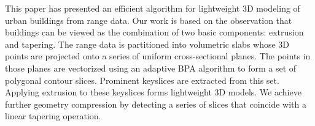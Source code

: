 \documentclass[10pt,twocolumn,letterpaper]{article}
\newcommand{\Figa}[1]{Fig.~\ref{fig:#1}(a)}
\newcommand{\Figb}[1]{Fig.~\ref{fig:#1}(b)}
\begin{document}
This paper has presented an efficient algorithm for lightweight 3D modeling
of urban buildings from range data.
Our work is based on the observation that buildings can be viewed as the
combination of two basic components: extrusion and tapering.
The range data is partitioned into volumetric slabs whose 3D points are
projected onto a series of uniform cross-sectional planes.
The points in those planes are vectorized using an adaptive BPA algorithm
to form a set of polygonal contour slices.
Prominent keyslices are extracted from this set.
Applying extrusion to these keyslices forms lightweight 3D models.
We achieve further geometry compression by detecting a series of
slices that coincide with a linear tapering operation.

% 
% 

{\small


}
\end{document}
